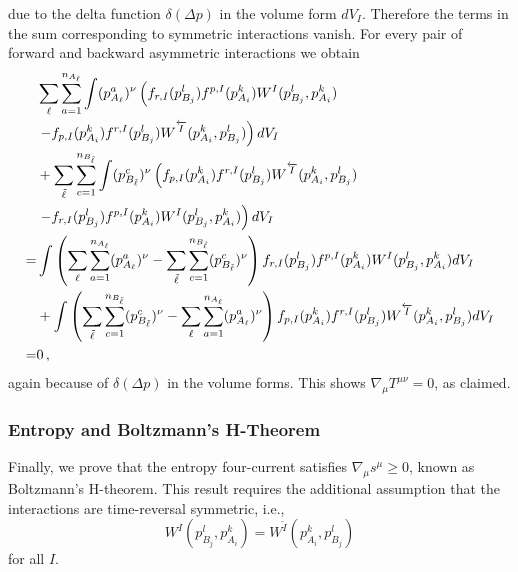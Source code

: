 due to the delta function $\delta(\Delta p)$ in the volume form $dV_I$.  Therefore the terms in the sum  corresponding to symmetric interactions vanish.  For every pair of forward and backward asymmetric interactions we obtain
\begin{align}
&\sum_\ell\sum_{a=1}^{n_{A_\ell}}\int (p_{A_\ell}^a)^{\nu}\left(f_{r,I}(p_{B_j}^l)f^{p,I}(p_{A_i}^k)W^I(p_{B_j}^l,p_{A_i}^k) \right.\\
&\left. -f_{p,I}(p_{A_i}^k)f^{r,I}(p_{B_j}^l)W^{\overleftarrow{I}}(p_{A_i}^k,p_{B_j}^l)\right)  dV_I\notag\\
&+\sum_{\tilde\ell}\sum_{c=1}^{n_{B_{\tilde\ell}}} \int (p_{B_{\tilde\ell}}^c)^{\nu}\left(f_{p,I}(p_{A_i}^k)f^{r,I}(p_{B_j}^l)W^{\overleftarrow{I}}(p_{A_i}^k,p_{B_j}^l) \right.\notag\\
&\left. -f_{r,I}(p_{B_j}^l)f^{p,I}(p_{A_i}^k)W^I(p_{B_j}^l,p_{A_i}^k)\right)  dV_I\notag\\
=&\int\left( \sum_\ell\sum_{a=1}^{n_{A_\ell}}(p_{A_\ell}^a)^{\nu} -\sum_{\tilde \ell}\sum_{c=1}^{n_{B_{\tilde\ell}}} (p_{B_{\tilde\ell}}^c)^{\nu}\right)f_{r,I}(p_{B_j}^l)f^{p,I}(p_{A_i}^k)W^I(p_{B_j}^l,p_{A_i}^k)  dV_I\notag\\
&+\int \left(\sum_{\tilde\ell}\sum_{c=1}^{n_{B_{\tilde\ell}}}(p_{B_{\tilde\ell}}^c)^{\nu}-\sum_\ell\sum_{a=1}^{n_{A_\ell}}(p_{A_\ell}^a)^{\nu}\right)f_{p,I}(p_{A_i}^k)f^{r,I}(p_{B_j}^l)W^{\overleftarrow{I}}(p_{A_i}^k,p_{B_j}^l) dV_I\notag\\
=&0\,,\notag
\end{align}
again because of $\delta(\Delta p)$ in the volume forms.  This shows $\nabla_\mu T^{\mu\nu}=0$, as claimed.

\subsubsection{Entropy and Boltzmann's H-Theorem}
Finally, we prove that the entropy four-current satisfies $\nabla_\mu s^\mu\geq 0$, known as Boltzmann's H-theorem. This result requires the additional assumption that the interactions are time-reversal symmetric,  i.e.,
\begin{equation}\label{time_symmetry}
W^I(p_{B_j}^l,p_{A_i}^k)=W^{\overleftarrow{I}}(p_{A_i}^k,p_{B_j}^l)
\end{equation}
for all $I$.  

